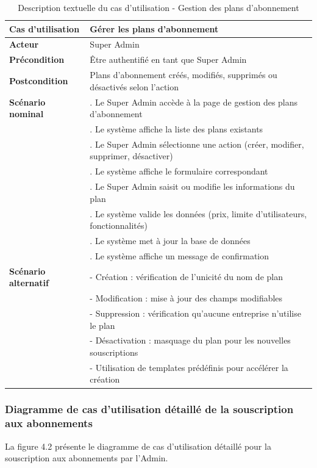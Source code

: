 \begin{longtable}{|>{\raggedright\arraybackslash}p{4cm}|>{\raggedright\arraybackslash}p{9cm}|}
\caption{Description textuelle du cas d'utilisation - Gestion des plans d'abonnement}
\label{tab:manage_subscription_plans_usecase} \\
\hline
\textbf{Cas d'utilisation} & \textbf{Gérer les plans d'abonnement} \\
\hline
\textbf{Acteur} & Super Admin \\
\hline
\textbf{Précondition} & Être authentifié en tant que Super Admin \\
\hline
\textbf{Postcondition} & Plans d'abonnement créés, modifiés, supprimés ou désactivés selon l'action \\
\hline
\textbf{Scénario nominal} & 
1. Le Super Admin accède à la page de gestion des plans d'abonnement \\
& 2. Le système affiche la liste des plans existants \\
& 3. Le Super Admin sélectionne une action (créer, modifier, supprimer, désactiver) \\
& 4. Le système affiche le formulaire correspondant \\
& 5. Le Super Admin saisit ou modifie les informations du plan \\
& 6. Le système valide les données (prix, limite d'utilisateurs, fonctionnalités) \\
& 7. Le système met à jour la base de données \\
& 8. Le système affiche un message de confirmation \\
\hline
\textbf{Scénario alternatif} & 
- Création : vérification de l'unicité du nom de plan \\
& - Modification : mise à jour des champs modifiables \\
& - Suppression : vérification qu'aucune entreprise n'utilise le plan \\
& - Désactivation : masquage du plan pour les nouvelles souscriptions \\
& - Utilisation de templates prédéfinis pour accélérer la création \\
\hline
\end{longtable}

\subsubsection{Diagramme de cas d'utilisation détaillé de la souscription aux abonnements}
\noindent La figure 4.2 présente le diagramme de cas d'utilisation détaillé pour la souscription aux abonnements par l'Admin.

